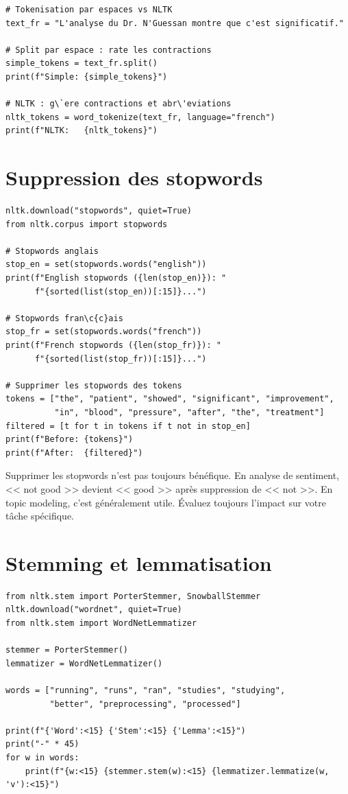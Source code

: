 \begin{verbatim}
# Tokenisation par espaces vs NLTK
text_fr = "L'analyse du Dr. N'Guessan montre que c'est significatif."

# Split par espace : rate les contractions
simple_tokens = text_fr.split()
print(f"Simple: {simple_tokens}")

# NLTK : g\`ere contractions et abr\'eviations
nltk_tokens = word_tokenize(text_fr, language="french")
print(f"NLTK:   {nltk_tokens}")
\end{verbatim}

\section{Suppression des stopwords}

\begin{verbatim}
nltk.download("stopwords", quiet=True)
from nltk.corpus import stopwords

# Stopwords anglais
stop_en = set(stopwords.words("english"))
print(f"English stopwords ({len(stop_en)}): "
      f"{sorted(list(stop_en))[:15]}...")

# Stopwords fran\c{c}ais
stop_fr = set(stopwords.words("french"))
print(f"French stopwords ({len(stop_fr)}): "
      f"{sorted(list(stop_fr))[:15]}...")

# Supprimer les stopwords des tokens
tokens = ["the", "patient", "showed", "significant", "improvement",
          "in", "blood", "pressure", "after", "the", "treatment"]
filtered = [t for t in tokens if t not in stop_en]
print(f"Before: {tokens}")
print(f"After:  {filtered}")
\end{verbatim}

\begin{warningbox}
Supprimer les stopwords n'est pas toujours b\'en\'efique. En analyse de sentiment, << not good >> devient << good >> apr\`es suppression de << not >>. En topic modeling, c'est g\'en\'eralement utile. \'Evaluez toujours l'impact sur votre t\^ache sp\'ecifique.
\end{warningbox}

\section{Stemming et lemmatisation}

\begin{verbatim}
from nltk.stem import PorterStemmer, SnowballStemmer
nltk.download("wordnet", quiet=True)
from nltk.stem import WordNetLemmatizer

stemmer = PorterStemmer()
lemmatizer = WordNetLemmatizer()

words = ["running", "runs", "ran", "studies", "studying",
         "better", "preprocessing", "processed"]

print(f"{'Word':<15} {'Stem':<15} {'Lemma':<15}")
print("-" * 45)
for w in words:
    print(f"{w:<15} {stemmer.stem(w):<15} {lemmatizer.lemmatize(w, 'v'):<15}")
\end{verbatim}

